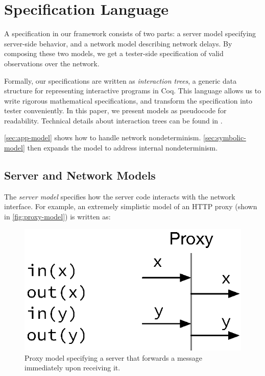 
\section{Specification Language}
\label{sec:spec-language}
A specification in our framework consists of two parts: a server model
specifying
server-side behavior,
and a network model describing network
delays.  By
composing these two models, we get a tester-side specification of valid
observations over the network.

Formally, our specifications are written as {\em interaction trees}, a generic
data structure for representing interactive programs in Coq.  This language
allows us to write rigorous mathematical specifications, and transform the
specification into tester conveniently.  In this
paper, we present models as pseudocode for readability.  Technical details
about interaction trees can be found in \cite{itree}.

\autoref{sec:app-model} shows how to handle network nondeterminism.
\autoref{sec:symbolic-model} then expands the model to address internal
nondeterminism.

\subsection{Server and Network Models}
\label{sec:app-model}


The {\em server model} specifies how the server code
interacts with the network interface.  For example, an extremely simplistic model of
an HTTP proxy
(shown in \autoref{fig:proxy-model}) is written as:

\begin{figure}
  \includegraphics[width=0.4\linewidth]{figures/proxy-linear}
  \caption{Proxy model specifying a server that forwards a message immediately
    upon receiving it.}
  \label{fig:proxy-model}
\end{figure}


